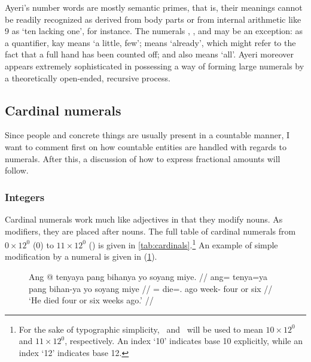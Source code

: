 Ayeri's number words are mostly semantic primes, that is, their meanings cannot
be readily recognized as derived from body parts \citep[74]{dixon2012} or from
internal arithmetic like 9 as `ten lacking one', for instance. The numerals
, , and  may
be an exception: as a quantifier,  {kay} means `a little,
few';  means `already', which might refer to the fact that a
full hand has been counted off; and  also means `all'. Ayeri
moreover appears extremely sophisticated in possessing a way of forming large
numerals by a theoretically open-ended, recursive process.

\subsection{Cardinal numerals}

Since people and concrete things are usually present in a countable manner, I
want to comment first on how countable entities are handled with regards to
numerals. After this, a discussion of how to express fractional amounts will
follow.

\subsubsection{Integers}

Cardinal numerals work much like adjectives in that they modify nouns. As
modifiers, they are placed after nouns. The full table of cardinal numerals
from $0 \times 12^0$ (0) to $11 \times 12^0$ (\elv) is given in
\autoref{tab:cardinals}.\footnote{For the sake of typographic simplicity, \ten\
and \elv\ will be used to mean $10 \times 12^0$ and $11 \times 12^0$,
respectively. An index `10' indicates base 10 explicitly, while an index `12'
indicates base 12.} An example of simple modification by a numeral is given in
(\ref{ex:nummod}).

\begin{figure}[h]
\ex\label{ex:nummod}
\begingl
	\gla Ang @ tenyaya pang bihanya yo soyang miye. //
	\glb ang= tenya=ya pang bihan-ya yo soyang miye //
	\glc \AgtT{}= die=\TsgM{}.\Top{} ago week-\Loc{} four or six //
	\glft `He died four or six weeks ago.' //
\endgl
\xe
\end{figure}

